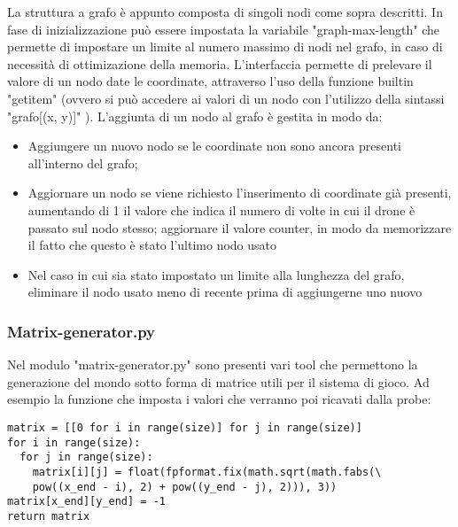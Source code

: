 La struttura a grafo è appunto composta di singoli nodi come sopra descritti. In fase di inizializzazione può essere impostata la variabile "graph-max-length" che permette di impostare un limite al numero massimo di nodi nel grafo, in caso di necessità di ottimizazione della memoria. 
L'interfaccia permette di prelevare il valore di un nodo date le coordinate, attraverso l'uso della funzione builtin "getitem" (ovvero si può accedere ai valori di un nodo con l'utilizzo della sintassi "grafo[(x, y)]" ). L'aggiunta di un nodo al grafo è gestita in modo da:
\begin{itemize}
\item Aggiungere un nuovo nodo se le coordinate non sono ancora presenti all'interno del grafo;

\item Aggiornare un nodo se viene richiesto l'inserimento di coordinate già presenti, aumentando di 1 il valore che indica il numero di volte in cui il drone è passato sul nodo stesso; aggiornare il valore counter, in modo da memorizzare il fatto che questo è stato l'ultimo nodo usato

\item Nel caso in cui sia stato impostato un limite alla lunghezza del grafo, eliminare il nodo usato meno di recente prima di aggiungerne uno nuovo
\end{itemize}
\subsubsection{Matrix-generator.py}
Nel modulo "matrix-generator.py" sono presenti vari tool che permettono la generazione del mondo sotto forma di matrice utili per il sistema di gioco. Ad esempio la funzione che imposta i valori che verranno poi ricavati dalla probe:
\begin{verbatim}
matrix = [[0 for i in range(size)] for j in range(size)]
for i in range(size):
  for j in range(size):
    matrix[i][j] = float(fpformat.fix(math.sqrt(math.fabs(\
    pow((x_end - i), 2) + pow((y_end - j), 2))), 3))
matrix[x_end][y_end] = -1
return matrix
\end{verbatim}

